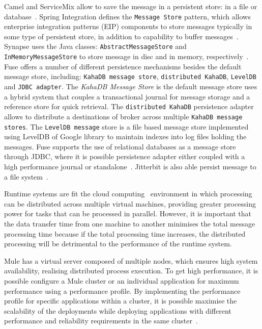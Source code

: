 Camel and ServiceMix allow to save the message in a persistent store: in a file or database~\cite{isen2010}. Spring Integration defines the \texttt{Message Store} pattern, which allows enterprise integration patterns (EIP) components to store messages typically in some type of persistent store, in addition to capability to buffer messages~\cite{Spring}. Synapse uses the Java classes: \texttt{AbstractMessageStore} and \texttt{InMemoryMessageStore} to store message in disc and in memory, respectively~\cite{Snapse}. Fuse offers a number of different persistence mechanisms besides the default message store, including: \texttt{KahaDB message store}, \texttt{distributed KahaDB}, \texttt{LevelDB} and \texttt{JDBC adapter}. The \emph{KahaDB Message Store} is the default message store uses a hybrid system that couples a transactional journal for message storage and a reference store for quick retrieval. The \texttt{distributed KahaDB} persistence adapter allows to distribute a destinations of broker across multiple \texttt{KahaDB message stores}. The \texttt{LevelDB message} store is a file based message store implemented using LevelDB of Google library to maintain indexes into log files holding the messages. Fuse supports the use of relational databases as a message store through JDBC, where it is possible persistence adapter either coupled with a high performance journal or standalone~\cite{Fuse}. Jitterbit is also able persist message to a file system~\cite{Jitterbit}.

Runtime systems are fit the cloud computing~\cite{hwang2013} environment in which processing can be distributed across multiple virtual machines, providing greater processing power for tasks that can be processed in parallel. However, it is important that the data transfer time from one machine to another minimises the total message processing time because if the total processing time increases, the distributed processing will be detrimental to the performance of the runtime system.

Mule has a virtual server composed of multiple nodes, which ensures high system availability, realising distributed process execution. To get high performance, it is possible configure a Mule cluster or an individual application for maximum performance using a performance profile. By implementing the performance profile for specific applications within a cluster, it is possible maximise the scalability of the deployments while deploying applications with different performance and reliability requirements in the same cluster~\cite{Mule}.

